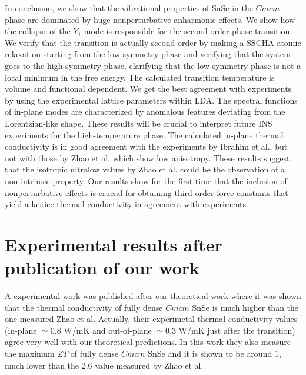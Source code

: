 In conclusion, we show that the vibrational properties of SnSe in the $Cmcm$ phase are dominated by huge nonperturbative anharmonic effects. We show how the collapse of the $Y_1$ mode is responsible for the second-order 
phase transition. We verify that the transition is actually second-order by making a SSCHA atomic relaxation starting from the low symmetry phase and verifying that the system goes to the high symmetry phase, clarifying that the low symmetry phase is not a local minimum in the free energy. The calculated transition temperature is volume and functional dependent. We get the best agreement with experiments by using the experimental lattice parameters within LDA. The spectral functions of in-plane modes are characterized by anomalous features deviating from the Lorentzian-like shape. These results will be crucial to interpret future INS experiments for the high-temperature phase. The calculated in-plane thermal conductivity is in good agreement with the experiments by Ibrahim et al.\cite{ibrahim2017reinvestigation}, but not with those by Zhao et al.\cite{zhao2014ultralow} which show low anisotropy. These results suggest that the isotropic ultralow values by Zhao et al. could be the observation of a non-intrinsic property. Our results show for the first time that the inclusion of nonperturbative effects is crucial for obtaining third-order force-constants that yield a lattice thermal conductivity in agreement with experiments.

\section{Experimental results after publication of our work}

A experimental work\cite{wei2019thermoelectric} was published after our theoretical work where it was shown that the thermal conductivity of fully dense $Cmcm$ SnSe is much higher than the one measured Zhao et al. Actually, their experimetal thermal conductivity values (in-plane $\simeq0.8$ W/mK and out-of-plane $\simeq0.3$ W/mK just after the transition) agree very well with our theoretical predictions. In this work they also measure the maximum $ZT$ of fully dense $Cmcm$ SnSe and it is shown to be around $1$, much lower than the $2.6$ value measured by Zhao et al. 

